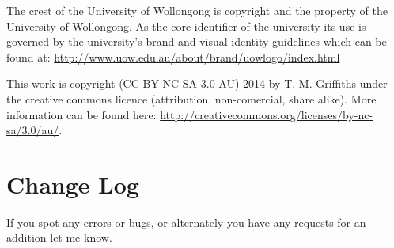 \documentclass[12pt,oneside]{article}
\begin{document}
The crest of the University of Wollongong is copyright and the property of the University of Wollongong. As the core identifier of the university its use is governed by the university's brand and visual identity guidelines 
which can be found at: \url{http://www.uow.edu.au/about/brand/uowlogo/index.html}

This work is copyright (CC BY-NC-SA 3.0 AU) 2014 by T. M. Griffiths under the creative commons licence (attribution, non-comercial, share alike). More information can be found here: \url{http://creativecommons.org/licenses/by-nc-sa/3.0/au/}.

\section{Change Log}
If you spot any errors or bugs, or alternately you have any requests for an addition let me know.
\end{document}
